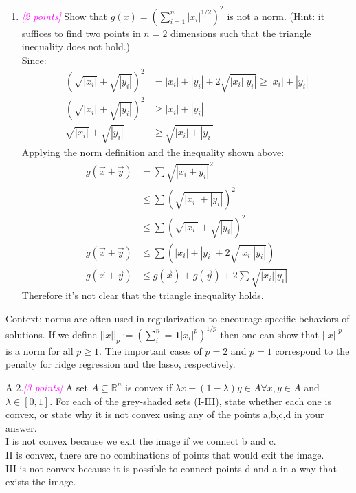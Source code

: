 \documentclass{article}
\newcommand{\field}[1]{\mathbb{#1}}
\newcommand{\1}{\mathbf{1}}
\newcommand{\R}{\field{R}} %
\newcommand{\points}[1]{\small\textcolor{magenta}{\emph{[#1 points]}} \normalsize}
\begin{document}
\begin{enumerate}
\newpage
\item \points{2} Show that $g(x) =(\sum^n_{i=1}|x_i|^{1/2})^2$ is not a norm. (Hint: it suffices to find two points in $n= 2$ dimensions such that the triangle inequality does not hold.) \\
Since:
\begin{align*}
    (\sqrt{|x_i|} + \sqrt{|y_i|})^2 &= |x_i| + |y_i| + 2\sqrt{|x_i||y_i|} \geq |x_i| + |y_i| \\
    (\sqrt{|x_i|} + \sqrt{|y_i|})^2 &\geq |x_i| + |y_i| \\
    \sqrt{|x_i|} + \sqrt{|y_i|} &\geq \sqrt{|x_i| + |y_i|}
\end{align*}
Applying the norm definition and the inequality shown above:
\begin{align*}
    g(\vec x + \vec y) &= \sum \sqrt{|x_i + y_i|}^2 \\
    &\leq \sum (\sqrt{|x_i|+|y_i|})^2 \\
    &\leq \sum (\sqrt{|x_i|}+\sqrt{|y_i|})^2 \\
    g(\vec x + \vec y) &\leq \sum \left(|x_i| + |y_i| + 2\sqrt{|x_i||y_i|}\right) \\
    g(\vec x + \vec y) &\leq g(\vec x) + g(\vec y) + 2\sum\sqrt{|x_i||y_i|}
\end{align*}
Therefore it's not clear that the triangle inequality holds. 

\end{enumerate}

Context: norms are often used in regularization to encourage specific behaviors of solutions. If we define $||x||_p:= (\sum^n_i = \1|x_i|^p)^{1/p}$ then one can show that $||x||^p$ is a norm for all $p\ge1$. The important cases of $p=2$ and $p=1$ correspond to the penalty for ridge regression and the lasso, respectively.



\newpage
A 2.\points{3} A set $A\subseteq \R^n$ is convex if $\lambda x + (1-\lambda)y \in A \forall x,y \in A$ and $\lambda\in [0,1]$. For each of the grey-shaded sets (I-III), state whether each one is convex, or state why it is not convex using any of the points a,b,c,d in your answer.\\
I is not convex because we exit the image if we connect b and c. \\
II is convex, there are no combinations of points that would exit the image. \\
III is not convex because it is possible to connect points d and a in a way that exists the image.
\end{document}
